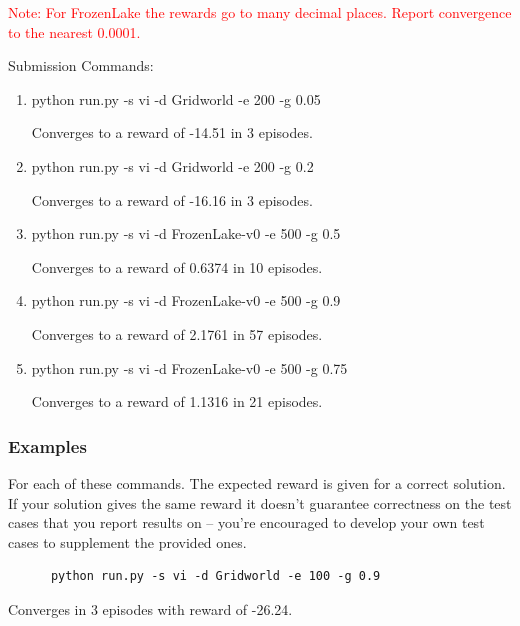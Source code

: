 \documentclass[a4paper]{article}
\theoremstyle{definition}
\newcommand{\red}[1]{\textcolor{red}{#1}}
\newenvironment{soln}{
    \leavevmode\color{blue}\ignorespaces
}{}
\begin{document}
\red{Note: For FrozenLake the rewards go to many decimal places. Report convergence to the nearest 0.0001.}

\vspace{8mm}

Submission Commands:
\begin{enumerate} 
    \item   python run.py -s vi -d Gridworld -e 200 -g 0.05
        \begin{soln}
            Converges to a reward of -14.51 in 3 episodes.
        \end{soln} 
    \item   python run.py -s vi -d Gridworld -e 200 -g 0.2
        \begin{soln}
            Converges to a reward of -16.16 in 3 episodes.
        \end{soln} 
    \item  python run.py -s vi -d FrozenLake-v0 -e 500 -g 0.5
        \begin{soln}
            Converges to a reward of 0.6374 in 10 episodes.
        \end{soln} 
    \item  python run.py -s vi -d FrozenLake-v0 -e 500 -g 0.9
        \begin{soln}
            Converges to a reward of 2.1761 in 57 episodes.
        \end{soln} 
    \item python run.py -s vi -d FrozenLake-v0 -e 500 -g 0.75
        \begin{soln}
            Converges to a reward of 1.1316 in 21 episodes.
        \end{soln} 
\end{enumerate}
    

\subsubsection*{Examples}

For each of these commands. The expected reward is given for a correct solution. 
If your solution gives the same reward it doesn't guarantee correctness on the test cases that you report results on -- you're encouraged to develop your own test cases to supplement the provided ones.

\begin{verbatim}
      python run.py -s vi -d Gridworld -e 100 -g 0.9  
\end{verbatim}
Converges in 3 episodes with reward of -26.24.
\end{document}

